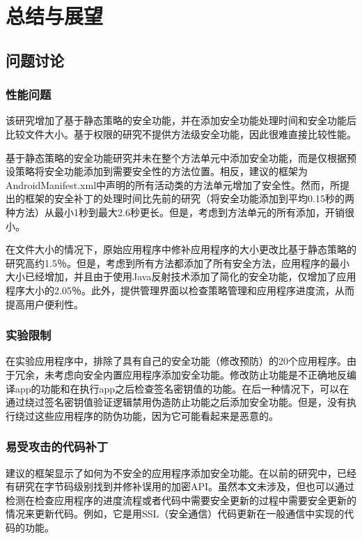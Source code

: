 \chapter{总结与展望}

	\section{问题讨论}

		\subsection{性能问题}
		
			该研究增加了基于静态策略的安全功能，并在添加安全功能处理时间和安全功能后比较文件大小。基于权限的研究不提供方法级安全功能，因此很难直接比较性能。

			基于静态策略的安全功能研究并未在整个方法单元中添加安全功能，而是仅根据预设策略将安全功能添加到需要安全性的方法位置。相反，建议的框架为AndroidManifest.xml中声明的所有活动类的方法单元增加了安全性。然而，所提出的框架的安全补丁的处理时间比先前的研究（将安全功能添加到平均0.15秒的两种方法）从最小1秒到最大2.6秒更长。但是，考虑到方法单元的所有添加，开销很小。

			在文件大小的情况下，原始应用程序中修补应用程序的大小更改比基于静态策略的研究高约1.5％。但是，考虑到所有方法都添加了所有安全方法，应用程序的最小大小已经增加，并且由于使用Java反射技术添加了简化的安全功能，仅增加了应用程序大小的2.05％。此外，提供管理界面以检查策略管理和应用程序进度流，从而提高用户便利性。
		
		\subsection{实验限制}
		
			在实验应用程序中，排除了具有自己的安全功能（修改预防）的20个应用程序。由于冗余，未考虑向安全内置应用程序添加安全功能。修改防止功能是不正确地反编译app的功能和在执行app之后检查签名密钥值的功能。在后一种情况下，可以在通过绕过签名密钥值验证逻辑禁用伪造防止功能之后添加安全功能。但是，没有执行绕过这些应用程序的防伪功能，因为它可能看起来是恶意的。

		\subsection{易受攻击的代码补丁}
	
			建议的框架显示了如何为不安全的应用程序添加安全功能。在以前的研究中，已经有研究在字节码级别找到并修补误用的加密API\cite{Ma_cdrep_2016}。虽然本文未涉及，但也可以通过检测在检查应用程序的进度流程或者代码中需要安全更新的过程中需要安全更新的情况来更新代码。例如，它是用SSL（安全通信）代码更新在一般通信中实现的代码的功能。


